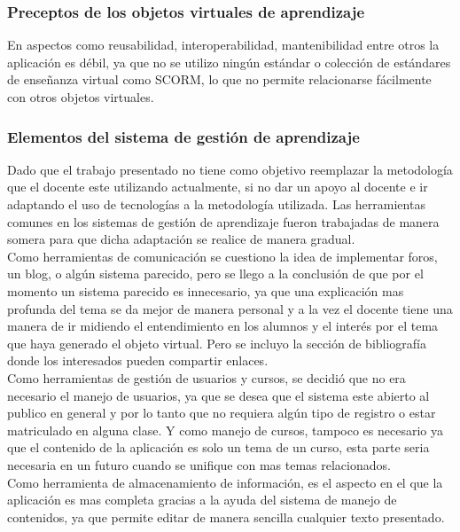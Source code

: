 \documentclass[letterpaper, 11pt, oneside]{article}
\theoremstyle{definition}
\theoremstyle{remark}
\begin{document}
\subsubsection{Preceptos de los objetos virtuales de aprendizaje}

En aspectos como reusabilidad, interoperabilidad, mantenibilidad entre otros la aplicación es débil, ya que no se utilizo ningún estándar o colección de estándares de enseñanza virtual como SCORM, lo que no permite relacionarse fácilmente con otros objetos virtuales.

\subsubsection{Elementos del sistema de gestión de aprendizaje}
Dado que el trabajo presentado no tiene como objetivo reemplazar la metodología que el docente este utilizando actualmente, si no dar un apoyo al docente e ir adaptando el uso de tecnologías a la metodología utilizada. Las herramientas comunes en los sistemas de gestión de aprendizaje fueron trabajadas de manera somera para que dicha adaptación se realice de manera gradual. \\

Como herramientas de comunicación se cuestiono la idea de implementar foros, un blog, o algún sistema parecido, pero se llego a la conclusión de que por el momento un sistema parecido es innecesario, ya que una explicación mas profunda del tema se da mejor de manera personal y a la vez el docente tiene una manera de ir midiendo el entendimiento en los alumnos y el interés por el tema que haya generado el objeto virtual. Pero se incluyo la sección de bibliografía donde los interesados pueden compartir enlaces. \\

Como herramientas de gestión de usuarios y cursos, se decidió que no era necesario el manejo de usuarios, ya que se desea que el sistema este abierto al publico en general y por lo tanto que no requiera algún tipo de registro o estar matriculado en alguna clase. Y como manejo de cursos, tampoco es necesario ya que el contenido de la aplicación es solo un tema de un curso, esta parte seria necesaria en un futuro cuando se unifique con mas temas relacionados. \\

Como herramienta de almacenamiento de información, es el aspecto en el que la aplicación es mas completa gracias a la ayuda del sistema de manejo de contenidos, ya que permite editar de manera sencilla cualquier texto presentado. \\
\end{document}
